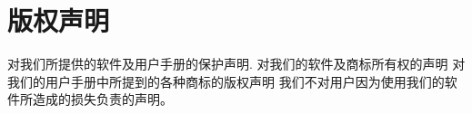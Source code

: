 \chapter{版权声明}
对我们所提供的软件及用户手册的保护声明.
对我们的软件及商标所有权的声明
对我们的用户手册中所提到的各种商标的版权声明
我们不对用户因为使用我们的软件所造成的损失负责的声明。
